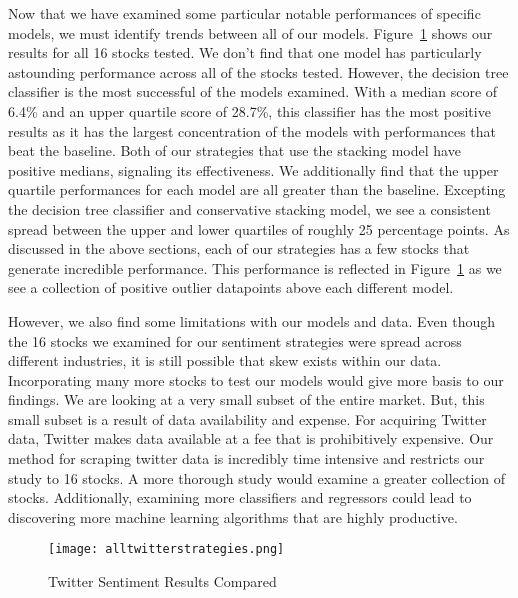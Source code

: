 \documentclass[../thesis.tex]{subfiles}
\begin{document}
Now that we have examined some particular notable performances of specific models, we must identify trends between all of our models. Figure~\ref{alltweetresults} shows our results for all 16 stocks tested. We don't find that one model has particularly astounding performance across all of the stocks tested. However, the decision tree classifier is the most successful of the models examined. With a median score of 6.4\% and an upper quartile score of 28.7\%, this classifier has the most positive results as it has the largest concentration of the models with performances that beat the baseline. Both of our strategies that use the stacking model have positive medians, signaling its effectiveness. We additionally find that the upper quartile performances for each model are all greater than the baseline. Excepting the decision tree classifier and conservative stacking model, we see a consistent spread between the upper and lower quartiles of roughly 25 percentage points. As discussed in the above sections, each of our strategies has a few stocks that generate incredible performance. This performance is reflected in Figure~\ref{alltweetresults} as we see a collection of positive outlier datapoints above each different model. 

However, we also find some limitations with our models and data. Even though the 16 stocks we examined for our sentiment strategies were spread across different industries, it is still possible that skew exists within our data. Incorporating many more stocks to test our models would give more basis to our findings. We are looking at a very small subset of the entire market. But, this small subset is a result of data availability and expense. For acquiring Twitter data, Twitter makes data available at a fee that is prohibitively expensive. Our method for scraping twitter data is incredibly time intensive and restricts our study to 16 stocks.  A more thorough study would examine a greater collection of stocks. Additionally, examining more classifiers and regressors could lead to discovering more machine learning algorithms that are highly productive. 

\begin{figure}[h]
\centering
\texttt{[image: alltwitterstrategies.png]}
\caption{Twitter Sentiment Results Compared \label{overflow}}
\label{alltweetresults}
\end{figure}
\end{document}
